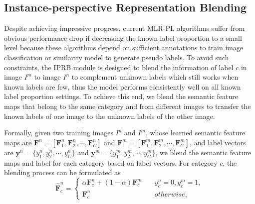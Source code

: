 \documentclass[lettersize,journal]{IEEEtran}
\begin{document}
\subsection{Instance-perspective Representation Blending}
Despite achieving impressive progress, current MLR-PL algorithms suffer from obvious performance drop if decreasing the known label proportion to a small level because these algorithms depend on sufficient annotations to train image classification or similarity model to generate pseudo labels. To avoid such constraints, the IPRB module is designed to blend the information of label $c$ in image $I^m$ to image $I^n$ to complement unknown labels which still works when known labels are few, thus the model performs consistently well on all known label proportion settings. To achieve this end, we blend the semantic feature maps that belong to the same category and from different images to transfer the known labels of one image to the unknown labels of the other image.

Formally, given two training images $I^n$ and $I^m$, whose learned semantic feature maps are $\textbf{F}^{n}=[\textbf{F}^{n}_1, \textbf{F}^{n}_2, \cdots, \textbf{F}^{n}_C]$ and $\textbf{F}^{m}=[\textbf{F}^{m}_1, \textbf{F}^{m}_2, \cdots, \textbf{F}^{m}_C]$, and label vectors are $\textbf{y}^n=\{y^n_1, y^n_2, \cdots, y^n_C\}$ and $\textbf{y}^m=\{y^m_1, y^m_2, \cdots, y^m_C\}$, we blend the semantic feature maps and label for each category based on label vectors. For category $c$, the blending process can be formulated as 
\begin{equation}
 \hat{\textbf{F}}^{n}_c=
  \begin{cases}     
   \alpha \textbf{F}^{n}_c + (1-\alpha) \textbf{F}^{m}_c \quad &  y^n_c=0, y^m_c=1, \\
   \textbf{F}^{n}_c \quad & otherwise,
  \end{cases}
\end{equation}
\end{document}
